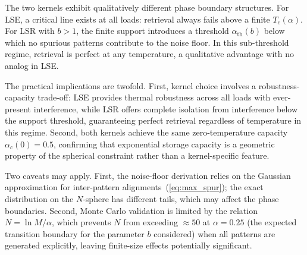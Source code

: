 \documentclass{article}
\theoremstyle{plain}
\theoremstyle{definition}
\theoremstyle{remark}
\begin{document}
The two kernels exhibit qualitatively different phase boundary structures. For LSE, a critical line exists at all loads: retrieval always fails above a finite $T_c(\alpha)$. For LSR with $b > 1$, the finite support introduces a threshold $\alpha_{\text{th}}(b)$ below which no spurious patterns contribute to the noise floor. In this sub-threshold regime, retrieval is perfect at any temperature, a qualitative advantage with no analog in LSE.

The practical implications are twofold. First, kernel choice involves a robustness-capacity trade-off: LSE provides thermal robustness across all loads with ever-present interference, while LSR offers complete isolation from interference below the support threshold, guaranteeing perfect retrieval regardless of temperature in this regime. Second, both kernels achieve the same zero-temperature capacity $\alpha_c(0) = 0.5$, confirming that exponential storage capacity is a geometric property of the spherical constraint rather than a kernel-specific feature.

Two caveats may apply. First, the noise-floor derivation relies on the Gaussian approximation for inter-pattern alignments~(\ref{eq:max_spur}); the exact distribution on the $N$-sphere has different tails, which may affect the phase boundaries. Second, Monte Carlo validation is limited by the relation $N = \ln M/\alpha$, which prevents $N$ from exceeding $\approx 50$ at $\alpha = 0.25$ (the expected transition boundary for the parameter $b$ considered) when all patterns are generated explicitly, leaving finite-size effects potentially significant.





\end{document}
